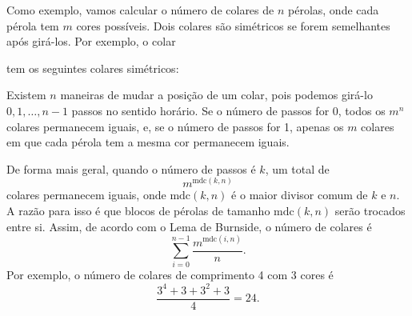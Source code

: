 Como exemplo, vamos calcular o número de
colares de $n$ pérolas,
onde cada pérola tem $m$ cores possíveis.
Dois colares são simétricos se forem
semelhantes após girá-los.
Por exemplo, o colar
\begin{center}
\end{center}
tem os seguintes colares simétricos:
\begin{center}
\end{center}
Existem $n$ maneiras de mudar a posição
de um colar,
pois podemos girá-lo
$0,1,\ldots,n-1$ passos no sentido horário.
Se o número de passos for 0,
todos os $m^n$ colares permanecem iguais,
e, se o número de passos for 1,
apenas os $m$ colares em que cada
pérola tem a mesma cor permanecem iguais.

De forma mais geral, quando o número de passos é $k$,
um total de
\[m^{\textrm{mdc}(k,n)}\]
colares permanecem iguais,
onde $\textrm{mdc}(k,n)$ é o maior divisor comum
de $k$ e $n$.
A razão para isso é que blocos
de pérolas de tamanho $\textrm{mdc}(k,n)$
serão trocados entre si.
Assim, de acordo com o Lema de Burnside,
o número de colares é
\[\sum_{i=0}^{n-1} \frac{m^{\textrm{mdc}(i,n)}}{n}. \]
Por exemplo, o número de colares de comprimento 4
com 3 cores é
\[\frac{3^4+3+3^2+3}{4} = 24. \]

